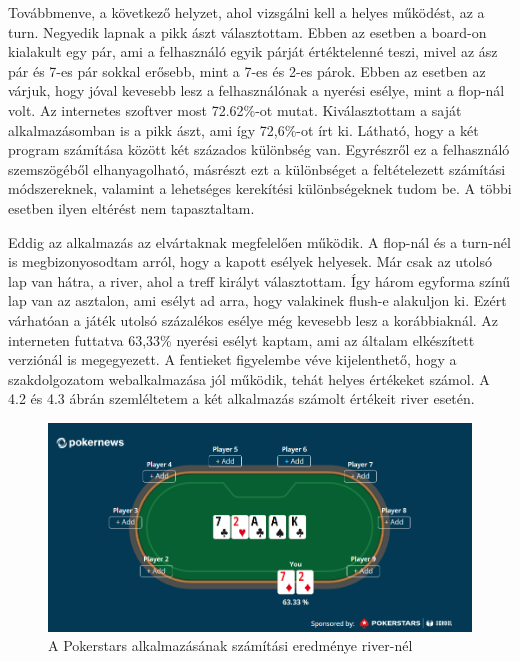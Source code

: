 Továbbmenve, a következő helyzet, ahol vizsgálni kell a helyes működést, az a turn. Negyedik lapnak a pikk ászt választottam. Ebben az esetben a board-on kialakult egy pár, ami a felhasználó egyik párját értéktelenné teszi, mivel az ász pár és 7-es pár sokkal erősebb, mint a 7-es és 2-es párok. Ebben az esetben az várjuk, hogy jóval kevesebb lesz a felhasználónak a nyerési esélye, mint a flop-nál volt. Az internetes szoftver most 72.62\%-ot mutat. Kiválasztottam a saját alkalmazásomban is a pikk ászt, ami így 72,6\%-ot írt ki. Látható, hogy a két program számítása között két százados különbség van. Egyrészről ez a felhasználó szemszögéből elhanyagolható, másrészt ezt a különbséget a feltételezett számítási módszereknek, valamint a lehetséges kerekítési különbségeknek tudom be. A többi esetben ilyen eltérést nem tapasztaltam.

Eddig az alkalmazás az elvártaknak megfelelően működik. A flop-nál és a turn-nél is megbizonyosodtam arról, hogy a kapott esélyek helyesek. Már csak az utolsó lap van hátra, a river, ahol a treff királyt választottam. Így három egyforma színű lap van az asztalon, ami esélyt ad arra, hogy valakinek flush-e alakuljon ki. Ezért várhatóan a játék utolsó százalékos esélye még kevesebb lesz a korábbiaknál. Az interneten futtatva 63,33\% nyerési esélyt kaptam, ami az általam elkészített verziónál is megegyezett. A fentieket figyelembe véve kijelenthető, hogy a szakdolgozatom webalkalmazása jól működik, tehát helyes értékeket számol. A 4.2 és 4.3 ábrán szemléltetem a két alkalmazás számolt értékeit river esetén.

\begin{figure}[ht]
\centering
\includegraphics[scale=0.7]{images/test-ps.png}
\caption{A Pokerstars alkalmazásának számítási eredménye river-nél \cite{pokerstars}}
\label{fig:test-ps}
\end{figure}

